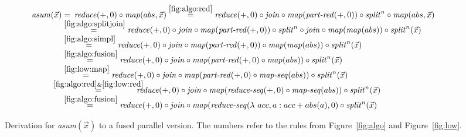 \begin{figure*}[t]
\begin{align}
  \text{\textit{asum}}(\vec{x})
  & =\hspace{.2em} \Reduce(+, 0) \circ \Map(abs, \vec{x})
   \overset{\ref{fig:algo:red}}{\hspace{.2em}=\hspace{.2em}}
      \Reduce(+, 0) \circ \MyJoin \circ \Map(\PartRed(+, 0)) \circ \MySplit{n} \circ \Map(abs, \vec{x})\\[-.5em]
  & \overset{\ref{fig:algo:splitjoin}}{=\hspace{.2em}}
      \Reduce(+, 0) \circ \MyJoin \circ \Map(\PartRed(+, 0)) \circ \MySplit{n} \circ \MyJoin \circ \Map(\Map(abs)) \circ \MySplit{n}(\vec{x})\\[-.5em]
  & \overset{\ref{fig:algo:simpl}}{=\hspace{.2em}}
      \Reduce(+, 0) \circ \MyJoin \circ \Map(\PartRed(+, 0)) \circ \Map(\Map(abs)) \circ \MySplit{n}(\vec{x})\\[-.5em]
  & \overset{\ref{fig:algo:fusion}}{=\hspace{.2em}}
      \Reduce(+, 0) \circ \MyJoin \circ \Map(\PartRed(+, 0) \circ \Map(abs)) \circ \MySplit{n}(\vec{x})\\[-.5em]
  & \overset{\ref{fig:low:map}}{=\hspace{.2em}}
      \Reduce(+, 0) \circ \MyJoin \circ \Map(\PartRed(+, 0) \circ \MapSeq(abs)) \circ \MySplit{n}(\vec{x})\\[-.5em]
  & \overset{\hspace{-1.3em}\ref{fig:algo:red}\& \ref{fig:low:red}\hspace{-1.1em}}{=\hspace{.2em}}
      \Reduce(+, 0) \circ \MyJoin \circ \Map(\RedSeq(+, 0) \circ \MapSeq(abs)) \circ \MySplit{n}(\vec{x})\\[-.5em]
  & \overset{\ref{fig:algo:fusion}}{=\hspace{.2em}}
      \Reduce(+, 0) \circ \MyJoin \circ \Map(\RedSeq(\lambda\ acc, a: acc + abs(a), 0) \circ \MySplit{n}(\vec{x})
\end{align}
\vspace{-2em}
\caption{Derivation for \emph{asum}$(\vec{x})$ to a fused parallel version.
  The numbers %
  refer to the rules from Figure~\ref{fig:algo} and Figure~\ref{fig:low}.
}
\label{fig:derivation}
\end{figure*}


